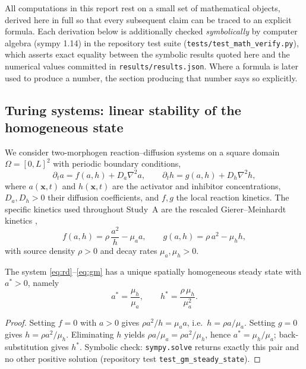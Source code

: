 All computations in this report rest on a small set of mathematical objects,
derived here in full so that every subsequent claim can be traced to an
explicit formula. Each derivation below is additionally checked
\emph{symbolically} by computer algebra (sympy 1.14) in the repository test
suite (\texttt{tests/test\_math\_verify.py}), which asserts exact equality
between the symbolic results quoted here and the numerical values committed
in \texttt{results/results.json}. Where a formula is later used to produce a
number, the section producing that number says so explicitly.

\subsection{Turing systems: linear stability of the homogeneous state}
\label{sec:math-turing}

We consider two-morphogen reaction--diffusion systems on a square domain
$\Omega = [0,L]^2$ with periodic boundary conditions,
\begin{equation}
\partial_t a = f(a,h) + D_a \nabla^2 a, \qquad
\partial_t h = g(a,h) + D_h \nabla^2 h ,
\label{eq:rd}
\end{equation}
where $a(\mathbf{x},t)$ and $h(\mathbf{x},t)$ are the activator and inhibitor
concentrations, $D_a, D_h > 0$ their diffusion coefficients, and $f, g$ the
local reaction kinetics. The specific kinetics used throughout Study~A are the
rescaled Gierer--Meinhardt kinetics \cite{gierer1972},
\begin{equation}
f(a,h) = \rho\,\frac{a^2}{h} - \mu_a a, \qquad
g(a,h) = \rho\, a^2 - \mu_h h ,
\label{eq:gm}
\end{equation}
with source density $\rho > 0$ and decay rates $\mu_a, \mu_h > 0$.

\begin{proposition}
\label{prop:ss}
The system \eqref{eq:rd}--\eqref{eq:gm} has a unique spatially homogeneous
steady state with $a^\ast > 0$, namely
\begin{equation}
a^\ast = \frac{\mu_h}{\mu_a}, \qquad
h^\ast = \frac{\rho\,\mu_h}{\mu_a^2}.
\label{eq:gmss}
\end{equation}
\end{proposition}
\begin{proof}
Setting $f = 0$ with $a > 0$ gives $\rho a^2 / h = \mu_a a$, i.e.\
$h = \rho a / \mu_a$. Setting $g = 0$ gives $h = \rho a^2 / \mu_h$.
Eliminating $h$ yields $\rho a / \mu_a = \rho a^2 / \mu_h$, hence
$a^\ast = \mu_h/\mu_a$; back-substitution gives $h^\ast$. Symbolic check:
\texttt{sympy.solve} returns exactly this pair and no other positive solution
(repository test \texttt{test\_gm\_steady\_state}).
\end{proof}

